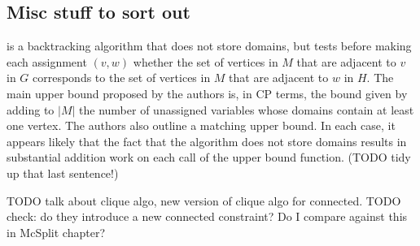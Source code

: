 \subsection{Misc stuff to sort out}

\citet{cao2008maximum} is a backtracking algorithm that does not store domains,
but tests before making each assignment $(v,w)$ whether the set of vertices in $M$
that are adjacent to $v$ in $G$ corresponds to the set of vertices in $M$ that
are adjacent to $w$ in $H$.  The main upper bound proposed by the authors
is, in CP terms, the bound given by adding to $|M|$ the number of unassigned
variables whose domains contain at least one vertex.  The authors also outline
a matching upper bound.  In each case, it appears likely that the fact that the algorithm does not
store domains results in substantial addition work on each call of the upper bound
function.  (TODO tidy up that last sentence!)

\citet{DBLP:conf/cp/McCreeshNPS16} TODO talk about clique algo, new version
of clique algo for connected. TODO check: do they introduce a new connected
constraint? Do I compare against this in McSplit chapter?



